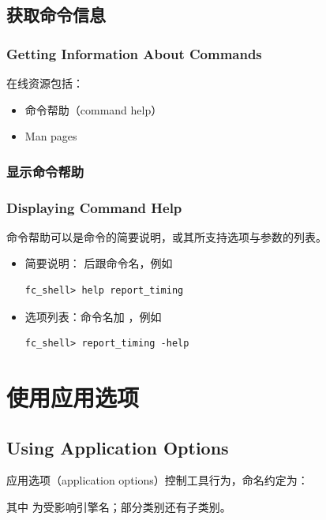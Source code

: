 \subsection{获取命令信息}
\subsubsection*{Getting Information About Commands}

在线资源包括：
\begin{itemize}
  \item 命令帮助（command help）
  \item Man pages
\end{itemize}

\subsubsection{显示命令帮助}
\subsubsection*{Displaying Command Help}

命令帮助可以是命令的简要说明，或其所支持选项与参数的列表。
\begin{itemize}
  \item 简要说明： 后跟命令名，例如
\begin{lstlisting}
fc_shell> help report_timing
\end{lstlisting}
  \item 选项列表：命令名加 ，例如
\begin{lstlisting}
fc_shell> report_timing -help
\end{lstlisting}
\end{itemize}

\section{使用应用选项}
\subsection*{Using Application Options}

应用选项（application options）控制工具行为，命名约定为：
\begin{center}
\end{center}
其中  为受影响引擎名；部分类别还有子类别。


